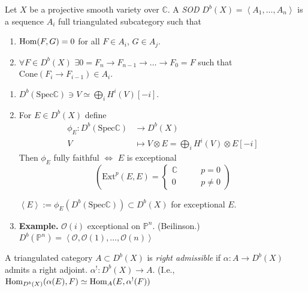 \begin{definition}
\label{definition-SOD}
Let $X$ be a projective smooth variety over
$\mathbb{C}$. A {\it SOD}
$D^b(X)=\left\langle{}A_1,\ldots,A_n\right\rangle{}$ is a
sequence $A_i$ full triangulated subcategory
such that
\begin{enumerate}
\item $\mathop{\mathrm{Hom}}\nolimits(F,G)=0$ for all $F \in A_i$, $G
\in A_j$.
\item $\forall F \in D^b(X)$ $\exists
0=F_n\to F_{n-1}\to\ldots\to F_0=F$
such that $\text{Cone}(F_i \to F_{i-1})\in
A_i$.
\end{enumerate}
\end{definition}

\begin{exercise}
\label{exercise-}
\begin{enumerate}
\item $D^b(\text{Spec}\mathbb{C})\ni V \simeq
\bigoplus_{i}H^{i}(V)[-i]$.
\item For $E \in D^b(X)$ define
$$
\begin{aligned}
\phi_E: D^b(\text{Spec}\mathbb{C})
&\longrightarrow D^b(X) \\
V &\longmapsto V\otimes
E=\bigoplus_{i}H^i(V)\otimes E[-i]
\end{aligned}
$$
Then $\phi_E$ fully faithful $\iff$ $E$ is
exceptional
$$
\left(\text{Ext}^p(E,E)=
\begin{cases}
\mathbb{C}\qquad &p=0 \\
0\qquad &p\neq 0
\end{cases}\right)
$$
\begin{definition}
\label{definition-duplicate-2}
$\left\langle{}E\right\rangle{}:=\phi_E(D^b(\text{Spec}
\mathbb{C}))\subset
D^b(X)$ for exceptional $E$.

\end{definition}
\item {\bf Example.} $\mathcal{O}(i)$
exceptional on $\mathbb{P}^n$.
(Beilinson.) $D^b(\mathbb{P}^n)
=\left\langle{}\mathcal{O},\mathcal{O}(1),\ldots,
\mathcal{O}(n)\right\rangle{}$
\end{enumerate}
\end{exercise}

\begin{definition}
\label{definition-right-admissible}
A triangulated category $A \subset D^b(X)$ is
{\it right admissible} if $\alpha:A\to
D^b(X)$ admits a right adjoint.
$\alpha^!:D^b(X)\to A$. (I.e.,
$\mathop{\mathrm{Hom}}\nolimits_{D^b(X)}(\alpha(E),F)\simeq
\mathop{\mathrm{Hom}}\nolimits_A(E,\alpha^!(F))$
\end{definition}


